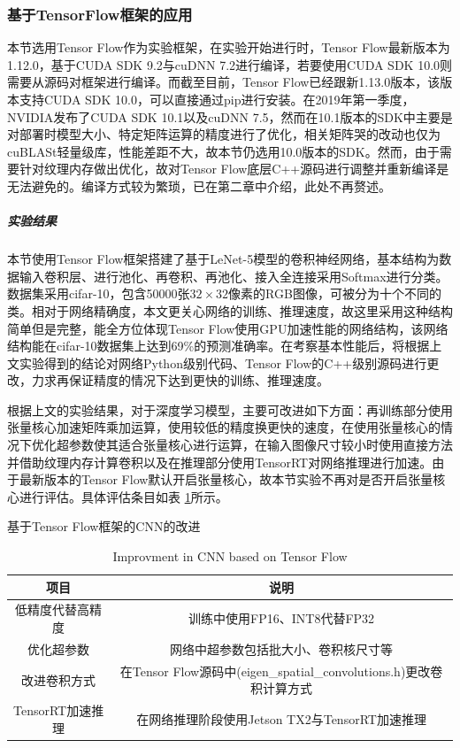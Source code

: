 \subsubsection{基于TensorFlow框架的应用}
\par 本节选用Tensor Flow作为实验框架，在实验开始进行时，Tensor Flow最新版本为1.12.0，基于CUDA SDK 9.2与cuDNN 7.2进行编译，若要使用CUDA SDK 10.0则需要从源码对框架进行编译。而截至目前，Tensor Flow已经跟新1.13.0版本，该版本支持CUDA SDK 10.0，可以直接通过pip进行安装。在2019年第一季度，NVIDIA发布了CUDA SDK 10.1以及cuDNN 7.5，然而在10.1版本的SDK中主要是对部署时模型大小、特定矩阵运算的精度进行了优化，相关矩阵哭的改动也仅为cuBLASt轻量级库，性能差距不大，故本节仍选用10.0版本的SDK。然而，由于需要针对纹理内存做出优化，故对Tensor Flow底层C++源码进行调整并重新编译是无法避免的。编译方式较为繁琐，已在第二章中介绍，此处不再赘述。
\subparagraph{实验结果}
\par 本节使用Tensor Flow框架搭建了基于LeNet-5模型的卷积神经网络，基本结构为数据输入卷积层、进行池化、再卷积、再池化、接入全连接采用Softmax进行分类。数据集采用cifar-10，包含50000张$ 32 \times 32 $像素的RGB图像，可被分为十个不同的类。相对于网络精确度，本文更关心网络的训练、推理速度，故这里采用这种结构简单但是完整，能全方位体现Tensor Flow使用GPU加速性能的网络结构，该网络结构能在cifar-10数据集上达到69\%的预测准确率。在考察基本性能后，将根据上文实验得到的结论对网络Python级别代码、Tensor Flow的C++级别源码进行更改，力求再保证精度的情况下达到更快的训练、推理速度。
\par 根据上文的实验结果，对于深度学习模型，主要可改进如下方面：再训练部分使用张量核心加速矩阵乘加运算，使用较低的精度换更快的速度，在使用张量核心的情况下优化超参数使其适合张量核心进行运算，在输入图像尺寸较小时使用直接方法并借助纹理内存计算卷积以及在推理部分使用TensorRT对网络推理进行加速。由于最新版本的Tensor Flow默认开启张量核心，故本节实验不再对是否开启张量核心进行评估。具体评估条目如表 \ref{table-TFList}所示。
\begin{table}
	\centering
	\renewcommand{\thetable}{\arabic{section}-\arabic{table} }
	\renewcommand{\tablename}{表}
	\caption{基于Tensor Flow框架的CNN的改进}
	\addtocounter{table}{-1}
	\renewcommand{\thetable}{\arabic{section}-\arabic{table} }
	\renewcommand{\tablename}{Table}
	\caption{Improvment in CNN based on Tensor Flow}
	\begin{tabular}{cc}
		\toprule
		项目 & 说明\\
		\midrule
		低精度代替高精度 & 训练中使用FP16、INT8代替FP32\\
		优化超参数 & 网络中超参数包括批大小、卷积核尺寸等\\
		改进卷积方式 & 在Tensor Flow源码中(eigen\_spatial\_convolutions.h)更改卷积计算方式\\
		TensorRT加速推理 & 在网络推理阶段使用Jetson TX2与TensorRT加速推理\\
		\bottomrule
	\end{tabular} \label{table-TFList} 
\end{table}
